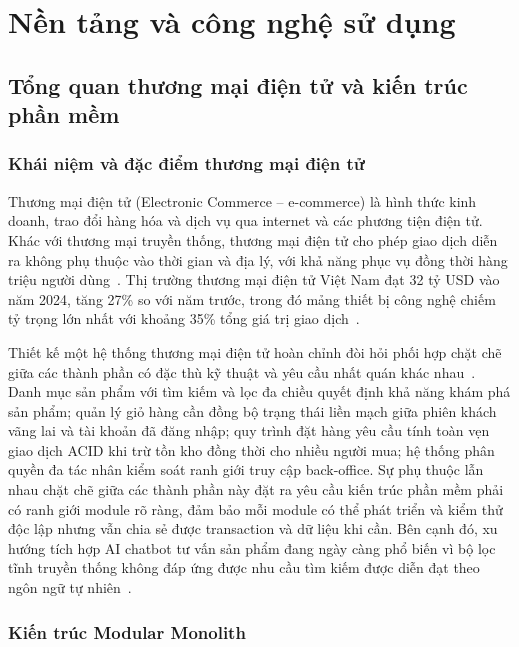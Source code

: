 \chapter{Nền tảng và công nghệ sử dụng}
\label{chap:c2_theory}

\section{Tổng quan thương mại điện tử và kiến trúc phần mềm}
\label{sec:c2_ecommerce_overview}

\subsection{Khái niệm và đặc điểm thương mại điện tử}

Thương mại điện tử (Electronic Commerce -- e-commerce) là hình thức kinh doanh, trao đổi hàng hóa và dịch vụ qua internet và các phương tiện điện tử. Khác với thương mại truyền thống, thương mại điện tử cho phép giao dịch diễn ra không phụ thuộc vào thời gian và địa lý, với khả năng phục vụ đồng thời hàng triệu người dùng~\cite{turban2018electronic}. Thị trường thương mại điện tử Việt Nam đạt 32 tỷ USD vào năm 2024, tăng 27\% so với năm trước, trong đó mảng thiết bị công nghệ chiếm tỷ trọng lớn nhất với khoảng 35\% tổng giá trị giao dịch~\cite{vecom2024}.

Thiết kế một hệ thống thương mại điện tử hoàn chỉnh đòi hỏi phối hợp chặt chẽ giữa các thành phần có đặc thù kỹ thuật và yêu cầu nhất quán khác nhau~\cite{turban2018electronic}. Danh mục sản phẩm với tìm kiếm và lọc đa chiều quyết định khả năng khám phá sản phẩm; quản lý giỏ hàng cần đồng bộ trạng thái liền mạch giữa phiên khách vãng lai và tài khoản đã đăng nhập; quy trình đặt hàng yêu cầu tính toàn vẹn giao dịch ACID khi trừ tồn kho đồng thời cho nhiều người mua; hệ thống phân quyền đa tác nhân kiểm soát ranh giới truy cập back-office. Sự phụ thuộc lẫn nhau chặt chẽ giữa các thành phần này đặt ra yêu cầu kiến trúc phần mềm phải có ranh giới module rõ ràng, đảm bảo mỗi module có thể phát triển và kiểm thử độc lập nhưng vẫn chia sẻ được transaction và dữ liệu khi cần. Bên cạnh đó, xu hướng tích hợp AI chatbot tư vấn sản phẩm đang ngày càng phổ biến vì bộ lọc tĩnh truyền thống không đáp ứng được nhu cầu tìm kiếm được diễn đạt theo ngôn ngữ tự nhiên~\cite{chen2021conversational}.

\subsection{Kiến trúc Modular Monolith}

